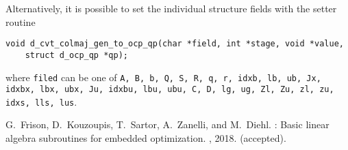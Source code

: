 \documentclass[a4paper]{report}
\begin{document}
Alternatively, it is possible to set the individual structure fields with the setter routine
\begin{verbatim}
void d_cvt_colmaj_gen_to_ocp_qp(char *field, int *stage, void *value,
    struct d_ocp_qp *qp);
\end{verbatim}
where {\tt filed} can be one of {\tt A, B, b, Q, S, R, q, r, idxb, lb, ub, Jx, idxbx, lbx, ubx, Ju, idxbu, lbu, ubu, C, D, lg, ug, Zl, Zu, zl, zu, idxs, lls, lus}.




%

\begin{thebibliography}{1}

G.~Frison, D.~Kouzoupis, T.~Sartor, A.~Zanelli, and M.~Diehl.
: Basic linear algebra subroutines for embedded
  optimization.
, 2018.
\newblock (accepted).

\end{thebibliography}
\end{document}
